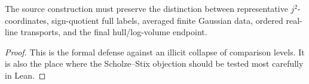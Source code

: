 \begin{theorem}
  \label{thm:preserve-comparison-levels}
  \notready
  The source construction must preserve the distinction between
  representative \(j^2\)-coordinates, sign-quotient full labels, averaged
  finite Gaussian data, ordered real-line transports, and the final
  hull/log-volume endpoint.
\end{theorem}

\begin{proof}
  This is the formal defense against an illicit collapse of comparison levels.
  It is also the place where the Scholze--Stix objection should be tested most
  carefully in Lean.
\end{proof}
